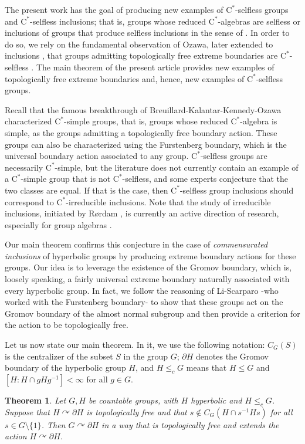 \documentclass[11pt]{article}
\newtheorem{thm}{Theorem}[section]
\theoremstyle{definition}
\theoremstyle{remark}
\numberwithin{equation}{section}
\numberwithin{equation}{section}
\newcommand{\Cs}{\ensuremath{\mathrm{C}^\ast}}
\numberwithin{equation}{section}
\begin{document}
The present work has the goal of producing new examples of \Cs-selfless groups and \Cs-selfless inclusions; that is, groups whose reduced \Cs-algebras are selfless or inclusions of groups that produce selfless inclusions in the sense of \cite{HKEPR25}. In order to do so, we rely on the fundamental observation of Ozawa, later extended to inclusions \cite{FKOCP26}, that groups admitting topologically free extreme boundaries are \Cs-selfless \cite{Oz25}. The main theorem of the present article provides new examples of topologically free extreme boundaries and, hence, new examples of \Cs-selfless groups.

Recall that the famous breakthrough of Breuillard-Kalantar-Kennedy-Ozawa \cite{BKKO17} characterized \Cs-simple groups, that is, groups whose reduced \Cs-algebra is simple, as the groups admitting a topologically free boundary action. These groups can also be characterized using the Furstenberg boundary, which is the universal boundary action associated to any group. \Cs-selfless groups are necessarily \Cs-simple, but the literature does not currently contain an example of a \Cs-simple group that is not \Cs-selfless, and some experts conjecture that the two classes are equal. If that is the case, then \Cs-selfless group inclusions should correspond to \Cs-irreducible inclusions. Note that the study of irreducible inclusions, initiated by R\o rdam \cite{Ro23}, is currently an active direction of research, especially for group algebras \cite{Ur22,BeOm23,LiSc23}.

Our main theorem confirms this conjecture in the case of \emph{commensurated inclusions} of hyperbolic groups by producing extreme boundary actions for these groups. Our idea is to leverage the existence of the Gromov boundary, which is, loosely speaking, a fairly universal extreme boundary naturally associated with every hyperbolic group. In fact, we follow the reasoning of Li-Scarparo \cite{LiSc23} -who worked with the Furstenberg boundary- to show that these groups act on the Gromov boundary of the almost normal subgroup and then provide a criterion for the action to be topologically free. 

Let us now state our main theorem. In it, we use the following notation: $C_G(S)$ is the centralizer of the subset $S$ in the group $G$; $\partial H$ denotes the Gromov boundary of the hyperbolic group $H$, and $H\leq_c G$ means that $H\leq G$ and $[H:H\cap gHg^{-1}]<\infty$ for all $g\in G$.

\begin{thm}\label{main}
    Let $G,H$ be countable groups, with $H$ hyperbolic and $H\leq_c G$. Suppose that $H\curvearrowright\partial H$ is topologically free and that $s\not\in C_G( H \cap s^{-1}Hs)$ for all $s\in G\setminus\{1\}$. Then $G\curvearrowright\partial H$ in a way that is topologically free and extends the action $H\curvearrowright\partial H$.
\end{thm}
\end{document}
